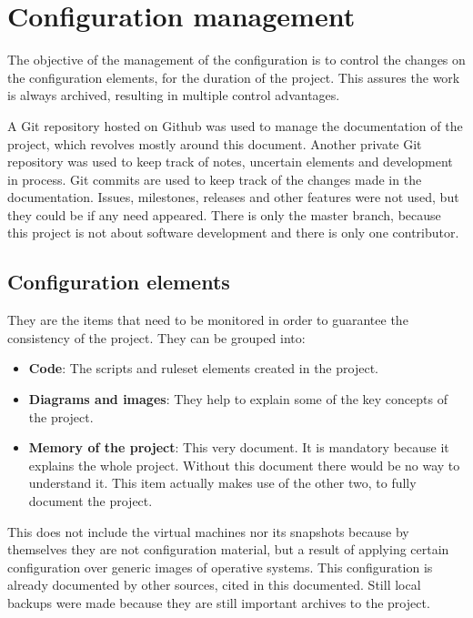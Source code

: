 \section{Configuration management}
The objective of the management of the configuration is to control the changes on the configuration elements, for the duration of the project. This assures the work is always archived, resulting in multiple control advantages.

\linej
\linej
A Git repository\cite{memoria_github} hosted on Github was used to manage the documentation of the project, which revolves mostly around this document.
Another private Git repository was used to keep track of notes, uncertain elements and development in process.
\linej
Git commits are used to keep track of the changes made in the documentation.
Issues, milestones, releases and other features were not used, but they could be if any need appeared.
There is only the master branch, because this project is not about software development and there is only one contributor.

\subsection{Configuration elements}
They are the items that need to be monitored in order to guarantee the consistency of the project.
They can be grouped into:
\begin{itemize}
	\item \textbf{Code}: The scripts and ruleset elements created in the project.
	\item \textbf{Diagrams and images}: They help to explain some of the key concepts of the project.
	\item \textbf{Memory of the project}: This very document. It is mandatory because it explains the whole project. Without this document there would be no way to understand it. This item actually makes use of the other two, to fully document the project.
\end{itemize}

This does not include the virtual machines nor its snapshots because by themselves they are not configuration material, but a result of applying certain configuration over generic images of operative systems. This configuration is already documented by other sources, cited in this documented. Still local backups were made because they are still important archives to the project.
